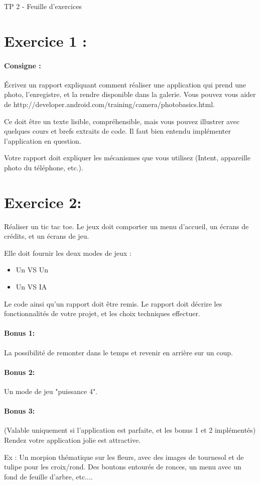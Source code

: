 \documentclass{article}
\begin{document}
\begin{center}
\large\sc TP 2 - Feuille d'exercices
\end{center}

\section{Exercice 1 :} 

\paragraph{Consigne : } Écrivez un rapport expliquant comment réaliser une application qui prend une photo, l'enregistre, et la rendre disponible dans la galerie. Vous pouvez vous aider de http://developer.android.com/training/camera/photobasics.html.

Ce doit être un texte lisible, compréhensible, mais vous pouvez illustrer avec quelques cours et brefs extraits de code.
Il faut bien entendu implémenter l'application en question.

Votre rapport doit expliquer les mécanismes que vous utilisez (Intent, appareille photo du téléphone, etc.).


\section{Exercice 2:}
 Réaliser un tic tac toe. Le jeux doit comporter un menu d’accueil, un écrans de crédits, et un écrans de jeu.

Elle doit fournir les deux modes de jeux :
\begin{itemize}
\item Un VS Un
\item Un VS IA
\end{itemize}

Le code ainsi qu'un rapport doit être remis. Le rapport doit décrire les fonctionnalités de votre projet, et les choix techniques effectuer.


\paragraph{Bonus 1:} La possibilité de remonter dans le temps et revenir en arrière sur un coup.

\paragraph{Bonus 2:} Un mode de jeu "puissance 4".

\paragraph{Bonus 3:} (Valable uniquement si l'application est parfaite, et les bonus 1 et 2 implémentés) Rendez votre application jolie est attractive.

Ex : Un morpion thématique sur les fleurs, avec des images de tournesol et de tulipe pour les croix/rond. Des boutons entourés de ronces, un menu avec un fond de feuille d'arbre, etc....
\end{document}
